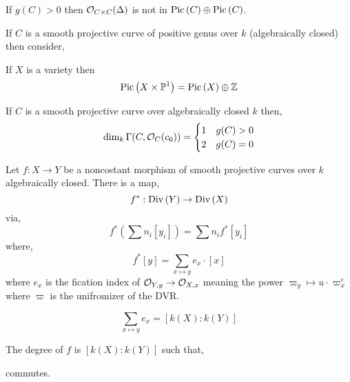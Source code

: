 \documentclass[12pt]{article}
\begin{document}
\begin{remark}
If $g(C) > 0$ then $\mathcal{O}_{C \times C}(\Delta)$ is not in $\mathrm{Pic} \left( C \right) \oplus \mathrm{Pic} \left( C \right)$. 
\end{remark}

\begin{example}
If $C$ is a smooth projective curve of positive genus over $k$ (algebraically closed) then consider,
\begin{center}
\end{center}
\end{example}

\begin{theorem}
If $X$ is a variety then
\[ \mathrm{Pic} \left( X \times \mathbb{P}^1 \right) = \mathrm{Pic} \left( X \right) \oplus \mathbb{Z} \]
\end{theorem}

\begin{lemma}
If $C$ is a smooth projective curve over algebraically closed $k$ then,
\[ \dim_k \Gamma(C, \mathcal{O}_{C}(c_0)) = \begin{cases}
1 & g(C) > 0
\\
2 & g(C) = 0
\end{cases} \]
\end{lemma}


\begin{definition}
Let $f : X \to Y$ be a noncostant morphism of smooth projective curves over $k$ algebraically closed. There is a map,
\[ f^* : \mathrm{Div}\left( Y \right) \to \mathrm{Div}\left( X \right) \]
via,
\[ f^*(\sum n_i [y_i]) = \sum n_i f^*[y_i] \]
where,
\[ f^*[y] = \sum_{x \mapsto y} e_x \cdot [x] \]
where $e_x$ is the   fication index of $\mathcal{O}_{Y, y} \to \mathcal{O}_{X, x}$ meaning the power $\varpi_y \mapsto u \cdot \varpi^e_x$ where $\varpi$ is the unifromizer of the DVR. 
\end{definition}

\begin{proposition}
\[ \sum_{x \mapsto y} e_x = [k(X) : k(Y)] \]
\end{proposition}

\begin{definition}
The degree of $f$ is $[k(X) : k(Y)]$ such that,
\begin{center}
\end{center}
commutes.
\end{definition}
\end{document}
